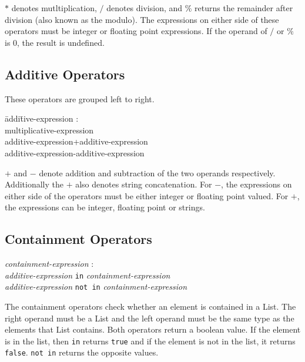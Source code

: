 \documentclass{article}
\begin{document}
$*$ denotes mutltiplication, $/$ denotes division, and $\%$ returns the remainder after division (also known as the modulo). The expressions on either side of these operators must be integer or floating point expressions. If the operand of $/$ or $\%$ is 0, the result is undefined.

\subsection{Additive Operators}
These operators are grouped left to right.
\begin{itshape}
\begin{tabbing}
	\= addi\=tive-expression : \\
		\> \> multiplicative-expression \\
		\>\> additive-expression+additive-expression \\		
		\>\> additive-expression-additive-expression
\end{tabbing}
\end{itshape}

$+$ and $-$ denote addition and subtraction of the two operands respectively. Additionally the $+$ also denotes string concatenation. For $-$, the expressions on either side of the operators must be either integer or floating point valued. For $+$, the expressions can be integer, floating point or strings.

\subsection{Containment Operators}
\begin{tabbing}
	\= \emph{cont}\=\emph{ainment-expression} : \\
		\>\> \emph{additive-expression} \texttt{in} \emph{containment-expression} \\	
		\>\> \emph{additive-expression} \texttt{not in} \emph{containment-expression} 
\end{tabbing}
The containment operators check whether an element is contained in a List. The right operand must be a List and the left operand must be the same type as the elements that List contains. Both operators return a boolean value. If the element is in the list, then \texttt{in} returns \texttt{true} and if the element is not in the list, it returns \texttt{false}. \texttt{not in} returns the opposite values.
\end{document}
